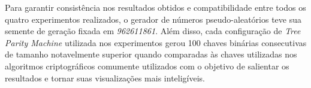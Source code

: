 \documentclass[12pt]{article}
\begin{document}
                    
                
            
            Para garantir consistência nos resultados obtidos e compatibilidade entre todos os quatro experimentos realizados, o gerador de números pseudo-aleatórios teve sua semente de geração fixada em \textit{962611861}. Além disso, cada configuração de \textit{Tree Parity Machine} utilizada nos experimentos gerou 100 chaves binárias consecutivas de tamanho notavelmente superior quando comparadas às chaves utilizadas nos algoritmos criptográficos comumente utilizados com o objetivo de salientar os resultados e tornar suas visualizações mais inteligíveis.
            

                    
                
\end{document}
